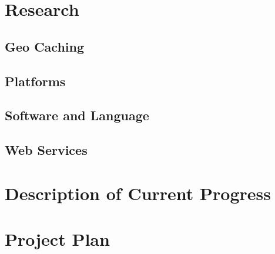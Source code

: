 \documentclass{article}
\begin{document}
\label{sec:Motivation}
\section{Research}
\subsection{Geo Caching}
\subsection{Platforms}
\subsection{Software and Language}
\subsection{Web Services}
\newpage


\label{sec:Objectives}
\section{Description of Current Progress}
\newpage

\label{sec:Objectives}
\section{Project Plan}
\end{document}
